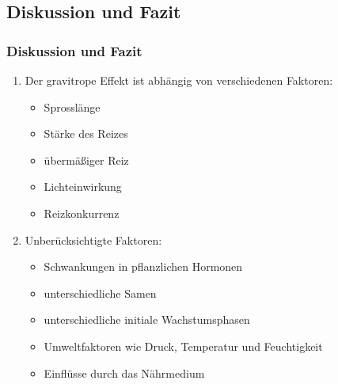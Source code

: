 \documentclass[aspectratio=169
]{beamer}
\begin{document}
%

\subsection{Diskussion und Fazit}
	
\begin{frame}[<+(1)->]
\frametitle{Diskussion und Fazit}
		
\begin{enumerate}
\item Der gravitrope Effekt ist abhängig von verschiedenen Faktoren:

\begin{itemize}
	\item Sprosslänge 
	\item Stärke des Reizes 
	\item übermäßiger Reiz
	\item Lichteinwirkung 
	\item Reizkonkurrenz
\end{itemize}

\item Unberücksichtigte Faktoren:

\begin{itemize}
	\item Schwankungen in pflanzlichen Hormonen
	\item unterschiedliche Samen
	\item unterschiedliche initiale Wachstumsphasen
	\item Umweltfaktoren wie Druck, Temperatur und Feuchtigkeit
	\item Einflüsse durch das Nährmedium
\end{itemize}

\end{enumerate}
\end{frame}	
\end{document}
